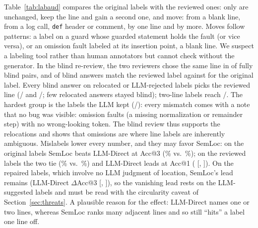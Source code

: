 Table~\ref{tab:labaud} compares the original labels with the reviewed ones: only \LabaudAllSame{} are
unchanged, \LabaudAllExtended{} keep the line and gain a second one, and \LabaudAllMoved{} move: \LabaudAllBlank{} from a
blank line, \LabaudAllNonCode{} from a log call, \texttt{def} header or comment, \LabaudAllOffByOne{} by one line and
\LabaudAllFarther{} by more. Moves follow patterns: a label on a guard whose guarded statement holds the fault (or vice
versa), or an omission fault labeled at its insertion point, a blank line. We suspect a labeling tool rather than human
annotators but cannot check without the generator. In the blind re-review, the two reviewers chose the same line in
\BlindBlindAllPairsAgree{} of \BlindBlindAllPairs{} fully blind pairs, and \BlindBlindAllMatchReviewed{} of
\BlindBlindAllNReviewed{} blind answers match the reviewed label against \BlindBlindAllMatchOriginal{} for the original
label. Every blind answer on relocated or LLM-rejected labels picks the reviewed line
(\BlindBlindFlaggedMatchReviewed/\BlindBlindFlaggedNReviewed{} and \BlindBlindRelocatedMatchReviewed/\BlindBlindRelocatedNReviewed;
few relocated answers stayed blind); two-line labels reach \BlindBlindTwoLineMatchReviewed/\BlindBlindTwoLineNReviewed. The
hardest group is the labels the LLM kept (\BlindBlindKeptMatchReviewed/\BlindBlindKeptNReviewed): every mismatch comes with
a note that no bug was visible: omission faults (a missing normalization or remainder step) with no wrong-looking token.
The blind review thus supports the relocations and shows that omissions are where line labels are inherently ambiguous.
Mislabels lower every number, and they may favor SemLoc: on the original
labels SemLoc beats LLM-Direct at Acc@3 (\RqTwoOriginalAllSemlocAccThreeMean\% vs.\
\RqTwoOriginalAllLlmDirectAccThreeMean\%); on the reviewed labels the two tie (\RqTwoReviewedAllSemlocAccThreeMean\% vs.\
\RqTwoReviewedAllLlmDirectAccThreeMean\%) and LLM-Direct leads at Acc@1 (\RqTwoReviewedAllLlmDirectDAccOne{}
[\RqTwoReviewedAllLlmDirectDAccOneLo, \RqTwoReviewedAllLlmDirectDAccOneHi]). On the repaired labels, which involve no LLM
judgment of location, SemLoc's lead remains (LLM-Direct $\Delta$Acc@3 \RqTwoRepairedAllLlmDirectDAccThree{}
[\RqTwoRepairedAllLlmDirectDAccThreeLo, \RqTwoRepairedAllLlmDirectDAccThreeHi]), so the vanishing lead rests on the
LLM-suggested labels and must be read with the circularity caveat of Section~\ref{sec:threats}. A plausible reason for the
effect: LLM-Direct names one or two lines, whereas SemLoc ranks many adjacent lines and so still ``hits'' a label one
line off.

